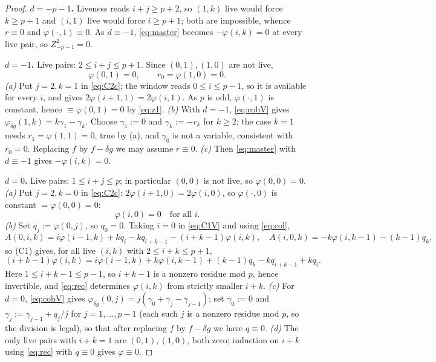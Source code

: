 \documentclass[11pt,reqno]{amsart}
\theoremstyle{plain}
\theoremstyle{definition}
\newcommand{\Zt}{Z^2}
\begin{document}
\begin{proof}
\textbf{$d=-p-1$.} Liveness reads $i+j\ge p+2$, so $(1,k)$ live would force $k\ge p+1$ and
$(i,1)$ live would force $i\ge p+1$; both are impossible, whence $r\equiv0$ and
$\varphi(\cdot,1)\equiv0$. As $d\equiv-1$, \eqref{eq:master} becomes $-\varphi(i,k)=0$ at
every live pair, so $\Zt_{-p-1}=0$.

\textbf{$d=-1$.} Live pairs: $2\le i+j\le p+1$. Since $(0,1),(1,0)$ are not live,
\begin{equation}
\varphi(0,1)=0,\qquad r_0=\varphi(1,0)=0 .
\label{eq:z1}
\end{equation}
\emph{(a)} Put $j=2,k=1$ in \eqref{eq:C2c}; the window reads $0\le i\le p-1$, so it is
available for every $i$, and gives $2\varphi(i+1,1)=2\varphi(i,1)$. As $p$ is odd,
$\varphi(\cdot,1)$ is constant, hence $\equiv\varphi(0,1)=0$ by \eqref{eq:z1}.
\emph{(b)} With $d=-1$, \eqref{eq:cobV} gives $\varphi_{\delta g}(1,k)=k\gamma_1-\gamma_k$.
Choose $\gamma_1:=0$ and $\gamma_k:=-r_k$ for $k\ge2$; the case $k=1$ needs
$r_1=\varphi(1,1)=0$, true by (a), and $\gamma_0$ is not a variable, consistent with
$r_0=0$. Replacing $f$ by $f-\delta g$ we may assume $r\equiv0$.
\emph{(c)} Then \eqref{eq:master} with $d\equiv-1$ gives $-\varphi(i,k)=0$.

\textbf{$d=0$.} Live pairs: $1\le i+j\le p$; in particular $(0,0)$ is not live, so
$\varphi(0,0)=0$.
\emph{(a)} Put $j=2,k=0$ in \eqref{eq:C2c}: $2\varphi(i+1,0)=2\varphi(i,0)$, so
$\varphi(\cdot,0)$ is constant $=\varphi(0,0)=0$:
\begin{equation}
\varphi(i,0)=0\quad\text{for all }i.
\label{eq:col}
\end{equation}
\emph{(b)} Set $q_j:=\varphi(0,j)$, so $q_0=0$. Taking $i=0$ in \eqref{eq:C1V} and using
\eqref{eq:col},
\[
A(0,i,k)=i\varphi(i-1,k)+kq_i-kq_{i+k-1}-(i+k-1)\varphi(i,k),\quad
A(i,0,k)=-k\varphi(i,k-1)-(k-1)q_k,
\]
so (C1) gives, for all live $(i,k)$ with $2\le i+k\le p+1$,
\begin{equation}
(i+k-1)\varphi(i,k)=i\varphi(i-1,k)+k\varphi(i,k-1)+(k-1)q_k-kq_{i+k-1}+kq_i .
\label{eq:rec}
\end{equation}
Here $1\le i+k-1\le p-1$, so $i+k-1$ is a nonzero residue mod $p$, hence invertible, and
\eqref{eq:rec} determines $\varphi(i,k)$ from strictly smaller $i+k$.
\emph{(c)} For $d=0$, \eqref{eq:cobV} gives
$\varphi_{\delta g}(0,j)=j(\gamma_0+\gamma_j-\gamma_{j-1})$; set $\gamma_0:=0$ and
$\gamma_j:=\gamma_{j-1}+q_j/j$ for $j=1,\dots,p-1$ (each such $j$ is a nonzero residue mod $p$,
so the division is legal), so that after replacing $f$ by $f-\delta g$ we have $q\equiv0$.
\emph{(d)} The only live pairs with $i+k=1$ are $(0,1),(1,0)$, both zero; induction on $i+k$
using \eqref{eq:rec} with $q\equiv0$ gives $\varphi\equiv0$.
\end{proof}
\end{document}
